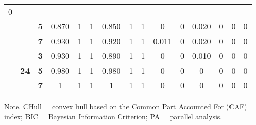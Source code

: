 \documentclass[a4paper,man,natbib]{apa6}
\begin{document}
\begin{table}[]
\begin{center}
{\begin{tabular}{ccccccccccccccc}
		0 \\ \cline{3-15} 
		&
		&
		\textbf{5} &
		0.870 &
		1 &
		1 &
		0.850 &
		1 &
		1 &
		0 &
		0 &
		0.020 &
		0 &
		0 &
		0 \\ \cline{3-15} 
		&
		&
		\textbf{7} &
		0.930 &
		1 &
		1 &
		0.920 &
		1 &
		1 &
		0.011 &
		0 &
		0.020 &
		0 &
		0 &
		0 \\ \cline{2-15} 
		&
		\multirow{3}{*}{\textbf{24}} &
		\textbf{3} &
		0.930 &
		1 &
		1 &
		0.890 &
		1 &
		1 &
		0 &
		0 &
		0.010 &
		0 &
		0 &
		0 \\ \cline{3-15} 
		&
		&
		\textbf{5} &
		0.980 &
		1 &
		1 &
		0.980 &
		1 &
		1 &
		0 &
		0 &
		0 &
		0 &
		0 &
		0 \\ \cline{3-15} 
		&
		&
		\textbf{7} &
		1 &
		1 &
		1 &
		1 &
		1 &
		1 &
		0 &
		0 &
		0 &
		0 &
		0 &
		0 \\ \hline
	\end{tabular}%
}
	\end{center}
 \begin{tablenotes}[flushleft]
	\small
	\item 	Note. CHull = convex hull based on the Common Part Accounted For (CAF) index; BIC = Bayesian Information Criterion; PA = parallel analysis.
\end{tablenotes}
\end{table}
\end{document}
